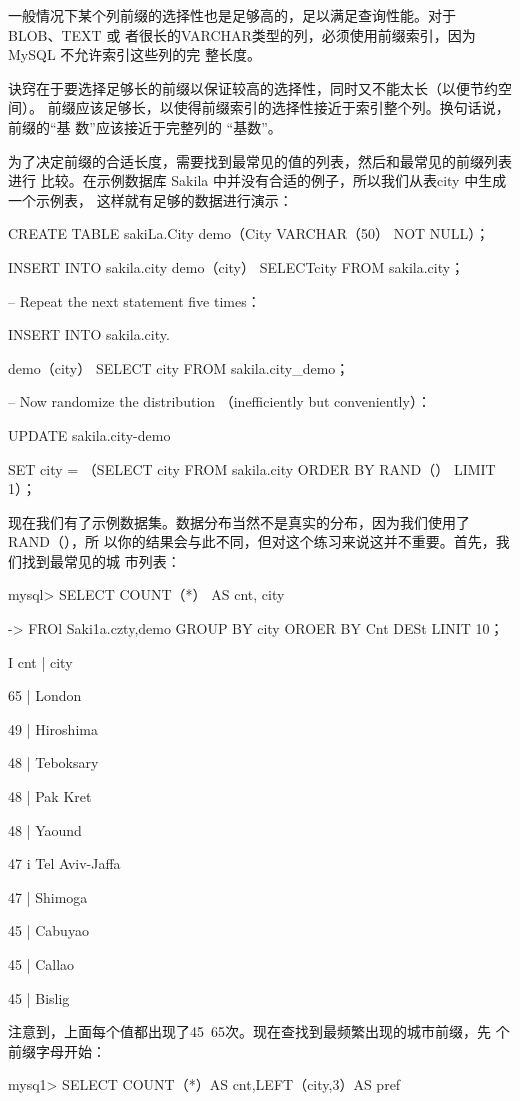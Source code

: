 一般情况下某个列前缀的选择性也是足够高的，足以满足查询性能。对于 BLOB、TEXT 或
者很长的VARCHAR类型的列，必须使用前缀索引，因为MySQL 不允许索引这些列的完
整长度。

诀窍在于要选择足够长的前缀以保证较高的选择性，同时又不能太长（以便节约空间）。
前缀应该足够长，以使得前缀索引的选择性接近于索引整个列。换句话说，前缀的“基
数”应该接近于完整列的 “基数”。

为了决定前缀的合适长度，需要找到最常见的值的列表，然后和最常见的前缀列表进行
比较。在示例数据库 Sakila 中并没有合适的例子，所以我们从表city 中生成一个示例表，
这样就有足够的数据进行演示：

CREATE TABLE sakiLa.City demo（City VARCHAR（50） NOT NULL）；

INSERT INTO sakila.city demo（city） SELECTcity FROM sakila.city；

-- Repeat the next statement five times：

INSERT INTO sakila.city.

demo（city） SELECT city FROM sakila.city\_demo；

-- Now randomize the distribution （inefficiently but conveniently）：

UPDATE sakila.city-demo

SET city = （SELECT city FROM sakila.city ORDER BY RAND（） LIMIT 1）；

现在我们有了示例数据集。数据分布当然不是真实的分布，因为我们使用了 RAND（），所
以你的结果会与此不同，但对这个练习来说这并不重要。首先，我们找到最常见的城
市列表：

mysql> SELECT COUNT（*） AS cnt, city

-> FROl Saki1a.czty,demo GROUP BY city OROER BY Cnt DESt LINIT 10；

I cnt | city

65 | London

49 | Hiroshima

48 | Teboksary

48 | Pak Kret

48 | Yaound

47 i Tel Aviv-Jaffa

47 | Shimoga

45 | Cabuyao

45 | Callao

45 | Bislig

注意到，上面每个值都出现了45~65次。现在查找到最频繁出现的城市前缀，先
个前缀字母开始：

mysq1> SELECT COUNT（*）AS cnt,LEFT（city,3）AS pref

